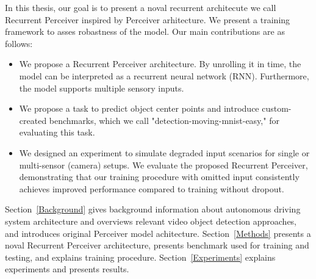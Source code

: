 In this thesis, our goal is to present a noval recurrent architecute we call Recurrent Perceiver inspired by Perceiver arhitecture. We present a training framework to asses robastness of the model.
Our main contributions are as follows:

\begin{itemize}
\item We propose a Recurrent Perceiver architecture. By unrolling it in time, the model can be interpreted as a recurrent neural network (RNN). Furthermore, the model supports multiple sensory inputs.
\item We propose a task to predict object center points and introduce custom-created benchmarks, which we call "detection-moving-mnist-easy," for evaluating this task.
\item We designed an experiment to simulate degraded input scenarios for single or multi-sensor (camera) setups. We evaluate the proposed Recurrent Perceiver, demonstrating that our training procedure with omitted input consistently achieves improved performance compared to training without dropout.
\end{itemize}



Section~\ref{Background} gives background information about autonomous driving system architecture and overviews relevant video object detection approaches, and introduces original Perceiver model achitecture. Section~\ref{Methods} presents a noval Recurrent Perceiver architecture, presents benchmark used for training and testing, and explains training procedure. Section~\ref{Experiments} explains experiments and presents results.





